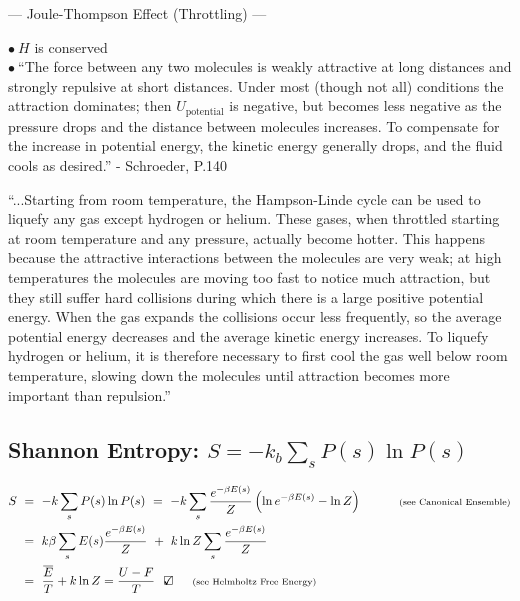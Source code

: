 \documentclass[12pt]{article}
\newcommand{\checkedbox}{\mbox{\ooalign{$\checkmark$\cr\hidewidth$\square$\hidewidth\cr}}} %
\begin{document}
\vspace{15pt}\noindent
\begin{minipage}{.98\textwidth}
    \scriptsize
    {\centering --- Joule-Thompson Effect (Throttling) --- \par} 

    \vspace{5pt} \(\bullet \ H\) is conserved \\[5pt]
    \(\bullet \ \)``The force between any two molecules is weakly attractive at long distances and
    strongly repulsive at short distances. Under most (though not all) conditions the
    attraction dominates; then \(U_\text{potential}\) is negative, but becomes less negative as the
    pressure drops and the distance between molecules increases. To compensate for
    the increase in potential energy, the kinetic energy generally drops, and the fluid
    cools as desired.'' - Schroeder, P.140
    
    ``...Starting from room temperature, the Hampson-Linde cycle can be used to 
    liquefy any gas except hydrogen or helium. These gases, when throttled starting at
    room temperature and any pressure, actually become hotter. This happens because
    the attractive interactions between the molecules are very weak; at high temperatures 
    the molecules are moving too fast to notice much attraction, but they still
    suffer hard collisions during which there is a large positive potential energy. When
    the gas expands the collisions occur less frequently, so the average potential energy
    decreases and the average kinetic energy increases.
    To liquefy hydrogen or helium, it is therefore necessary to first cool the gas
    well below room temperature, slowing down the molecules until attraction becomes
    more important than repulsion.''  
\end{minipage}

\newpage
\subsection{Shannon Entropy: \(\boxed{S = -k_b \sum_s P(s) \ln{P(s)}}\)}
\vspace{5pt}\noindent
\(\begin{aligned}
    S \ &=\ -k \sum_s P(s) \ln{P(s)}
        \ =\ -k \sum_s \frac{ e^{- \beta E(s)} }{Z} \left( \ln{e^{- \beta E(s)}} - \ln{Z} \right)
        \indent\indent \text{\scriptsize(see Canonical Ensemble)}\\
    \ &=\ k \beta \sum_s E(s) \frac{ e^{- \beta E(s)} }{Z} \ +\ k \ln{Z} \sum_s \frac{ e^{- \beta E(s)} }{Z}\\
    \ &=\ \frac{ \overline{E} }{T} + k \ln{Z} = \frac{U-F}{T} \ \ \checkedbox
        \indent \text{\scriptsize(see Helmholtz Free Energy)}
\end{aligned}\)
\end{document}
